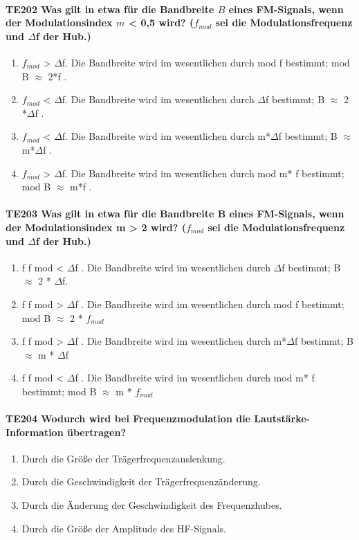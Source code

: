 \documentclass[8pt]{article}
\begin{document}
\begin{enumerate}
\begin{enumerate}[nolistsep,label=\Alph*]
\paragraph*{TE202 Was gilt in etwa für die Bandbreite $B$ eines FM-Signals, wenn der Modulationsindex $m$ < 0,5 wird? ($f_{mod}$ sei die Modulationsfrequenz und $\Delta$f der Hub.)}
\begin{enumerate}[nolistsep,label=\Alph*]
\item $f_{mod}$ > $\Delta$f. Die Bandbreite wird im wesentlichen
durch mod f bestimmt; mod B $\approx$ 2*f .
\item $f_{mod}$ < $\Delta$f. Die Bandbreite wird im wesentlichen
durch $\Delta$f bestimmt; B $\approx$ 2 *$\Delta$f .
\item $f_{mod}$ < $\Delta$f. Die Bandbreite wird im wesentlichen
durch m*$\Delta$f bestimmt; B $\approx$ m*$\Delta$f .
\item $f_{mod}$ > $\Delta$f. Die Bandbreite wird im wesentlichen
durch mod m* f bestimmt; mod B $\approx$ m*f .
\end{enumerate}

\paragraph*{TE203 Was gilt in etwa für die Bandbreite B eines FM-Signals, wenn der Modulationsindex m > 2 wird? ($f_{mod}$ sei die Modulationsfrequenz und $\Delta$f der Hub.)}
\begin{enumerate}[nolistsep,label=\Alph*]
\item f f mod < $\Delta$f . Die Bandbreite wird im wesentlichen durch $\Delta$f bestimmt; B $\approx$ 2 * $\Delta$f.
\item f f mod > $\Delta$f . Die Bandbreite wird im wesentlichen durch mod f bestimmt; mod B $\approx$ 2 * $f_{mod}$
\item f f mod > $\Delta$f . Die Bandbreite wird im wesentlichen durch m*$\Delta$f bestimmt; B $\approx$ m * $\Delta$f
\item f f mod < $\Delta$f . Die Bandbreite wird im wesentlichen durch mod m* f bestimmt; mod B $\approx$ m * $f_{mod}$
\end{enumerate}

\paragraph*{TE204 Wodurch wird bei Frequenzmodulation die Lautstärke-Information übertragen?}
\begin{enumerate}[nolistsep,label=\Alph*]
\item Durch die Größe der Trägerfrequenzauslenkung.
\item Durch die Geschwindigkeit der Trägerfrequenzänderung.
\item Durch die Änderung der Geschwindigkeit des Frequenzhubes.
\item Durch die Größe der Amplitude des HF-Signals.
\end{enumerate}


\end{enumerate}
\end{enumerate}
\end{document}
